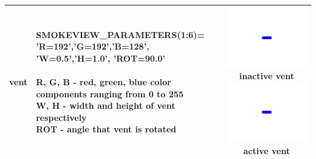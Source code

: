 \begin{longtable}[ht]{|l|l|c|}
{\ct vent} &
\parbox[c]{\boxwidth}{
{\ct SMOKEVIEW\_PARAMETERS(1:6)=}\\
{\ct 'R=192','G=192','B=128',}\\
{\ct 'W=0.5','H=1.0', 'ROT=90.0'}\\ \\
R, G, B - red, green, blue color components ranging from 0 to 255\\
W, H - width and height of vent respectively\\
ROT - angle that vent is rotated
} &
\parbox[c]{\devicewidth}{
\vspace{0.01in}
\includegraphics[width=\devicewidth]{SCRIPT_FIGURES/vent1}
inactive vent\\
\vspace{0.01in}
\includegraphics[width=\devicewidth]{SCRIPT_FIGURES/vent2}
active vent\\
\vspace{0.01in}
}
\\ \hline
\end{longtable}

